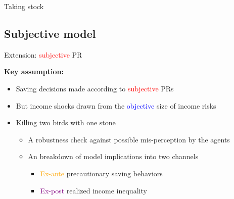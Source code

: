 \documentclass{beamer}
\begin{document}
\begin{frame}{Taking stock}
	\label{StE_dist_compare_table}
	\begin{table}[p]
		\centering
		\begin{adjustbox}{width={0.8\textwidth}}
		
	\end{adjustbox}
	\end{table}
\end{frame}

\subsection{Subjective model}


\begin{frame}{Extension: \textcolor{red}{subjective} PR}
	
	\textbf{Key assumption:}
	\\
	\begin{itemize}
		\item Saving decisions made according to \textcolor{red}{subjective} PRs
		\item But income shocks drawn from the \textcolor{blue}{objective} size of income risks
	\end{itemize}
	
	\begin{itemize}
		\item Killing two birds with one stone 
		\begin{itemize}
			\item A robustness check against possible mis-perception by the agents
			\item An breakdown of model implications into two channels 
			\begin{itemize}
				\item \textcolor{orange}{Ex-ante} precautionary saving behaviors 
				\item \textcolor{purple}{Ex-post} realized income inequality 
			\end{itemize}
		\end{itemize}
	\end{itemize}
\end{frame}
\end{document}
